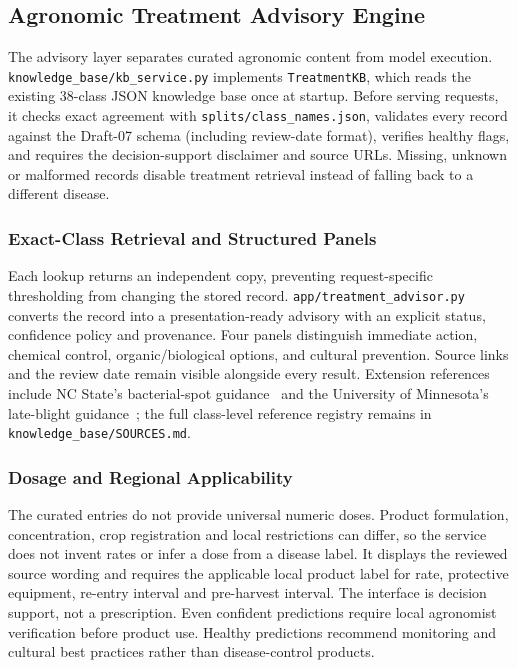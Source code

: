\subsection{Agronomic Treatment Advisory Engine}
\label{subsec:treatment_advisory}
The advisory layer separates curated agronomic content from model execution. \texttt{knowledge\_base/kb\_service.py} implements \texttt{TreatmentKB}, which reads the existing 38-class JSON knowledge base once at startup. Before serving requests, it checks exact agreement with \texttt{splits/class\_names.json}, validates every record against the Draft-07 schema (including review-date format), verifies healthy flags, and requires the decision-support disclaimer and source URLs. Missing, unknown or malformed records disable treatment retrieval instead of falling back to a different disease.

\subsubsection{Exact-Class Retrieval and Structured Panels}
Each lookup returns an independent copy, preventing request-specific thresholding from changing the stored record. \texttt{app/treatment\_advisor.py} converts the record into a presentation-ready advisory with an explicit status, confidence policy and provenance. Four panels distinguish immediate action, chemical control, organic/biological options, and cultural prevention. Source links and the review date remain visible alongside every result. Extension references include NC State's bacterial-spot guidance~\cite{pepper_bacterial_spot} and the University of Minnesota's late-blight guidance~\cite{tomato_late_blight}; the full class-level reference registry remains in \texttt{knowledge\_base/SOURCES.md}.

\subsubsection{Dosage and Regional Applicability}
The curated entries do not provide universal numeric doses. Product formulation, concentration, crop registration and local restrictions can differ, so the service does not invent rates or infer a dose from a disease label. It displays the reviewed source wording and requires the applicable local product label for rate, protective equipment, re-entry interval and pre-harvest interval. The interface is decision support, not a prescription. Even confident predictions require local agronomist verification before product use. Healthy predictions recommend monitoring and cultural best practices rather than disease-control products.

